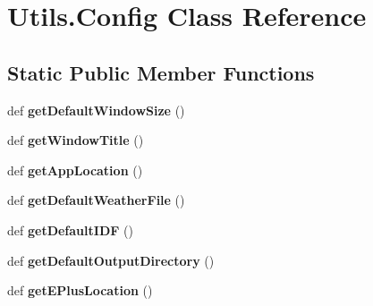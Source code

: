 \hypertarget{class_c_utils_1_1_utils_1_1_config}{}\section{Utils.\+Config Class Reference}
\label{class_c_utils_1_1_utils_1_1_config}
\subsection*{Static Public Member Functions}
\begin{DoxyCompactItemize}
\item 
\mbox{\label{class_c_utils_1_1_utils_1_1_config_a7de4021b6d5a4eb22be1439bfd497da8}} 
def {\bfseries get\+Default\+Window\+Size} ()
\item 
\mbox{\label{class_c_utils_1_1_utils_1_1_config_ae65cf338bda5bc527b1ace77855f0492}} 
def {\bfseries get\+Window\+Title} ()
\item 
\mbox{\label{class_c_utils_1_1_utils_1_1_config_a81185817b7a3d1bd7d5ce9bd22517541}} 
def {\bfseries get\+App\+Location} ()
\item 
\mbox{\label{class_c_utils_1_1_utils_1_1_config_a5fd0ae1aae4daaa4152b7407ff15e529}} 
def {\bfseries get\+Default\+Weather\+File} ()
\item 
\mbox{\label{class_c_utils_1_1_utils_1_1_config_af548a638e3529545cd9b759510f8f9fd}} 
def {\bfseries get\+Default\+I\+DF} ()
\item 
\mbox{\label{class_c_utils_1_1_utils_1_1_config_ac6c54378c1b87319af5bbb80031892e8}} 
def {\bfseries get\+Default\+Output\+Directory} ()
\item 
\mbox{\label{class_c_utils_1_1_utils_1_1_config_afdfd433c9e4b6c8ba7217773cdbd2893}} 
def {\bfseries get\+E\+Plus\+Location} ()
\item 
\mbox{\label{class_c_utils_1_1_utils_1_1_config_a224e9f504a70979b42b2f9d8a15d80ed}} 

\end{DoxyCompactItemize}
